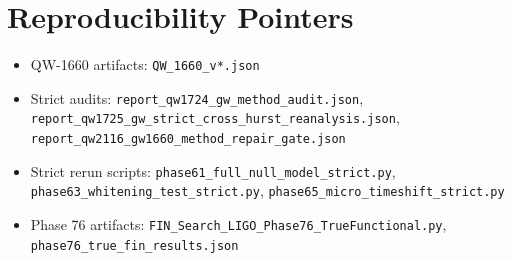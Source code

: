 \documentclass[11pt,a4paper]{article}
\begin{document}
\section*{Reproducibility Pointers}
\begin{itemize}[leftmargin=1.5em]
    \item QW-1660 artifacts: \texttt{QW\_1660\_v*.json}
    \item Strict audits: \texttt{report\_qw1724\_gw\_method\_audit.json}, \texttt{report\_qw1725\_gw\_strict\_cross\_hurst\_reanalysis.json}, \texttt{report\_qw2116\_gw1660\_method\_repair\_gate.json}
    \item Strict rerun scripts: \texttt{phase61\_full\_null\_model\_strict.py}, \texttt{phase63\_whitening\_test\_strict.py}, \texttt{phase65\_micro\_timeshift\_strict.py}
    \item Phase 76 artifacts: \texttt{FIN\_Search\_LIGO\_Phase76\_TrueFunctional.py}, \texttt{phase76\_true\_fin\_results.json}
\end{itemize}
\end{document}
